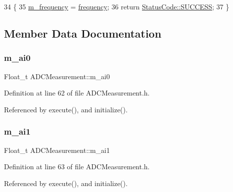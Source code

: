 \begin{DoxyCode}
34                                                  \{
35     \hyperlink{classADCMeasurement_ab4a0653cc015ddf9b33b877c1d43b260}{m\_frequency} = \hyperlink{classADCMeasurement_ad3d523331ad64494f2415319a03c638e}{frequency};
36     \textcolor{keywordflow}{return} \hyperlink{classStatusCode_a6f565cbeadc76d14c72f047e5e85eb4badd0da38d3ba0d922efd1f4619bc37ad8}{StatusCode::SUCCESS};
37   \}
\end{DoxyCode}


\subsection{Member Data Documentation}
\mbox{\label{classADCMeasurement_a97ab811c2ef605184b78593cedea275b}} 
\subsubsection{\texorpdfstring{m\+\_\+ai0}{m\_ai0}}
{\footnotesize\ttfamily Float\+\_\+t A\+D\+C\+Measurement\+::m\+\_\+ai0\hspace{0.3cm}{\ttfamily [private]}}



Definition at line 62 of file A\+D\+C\+Measurement.\+h.



Referenced by execute(), and initialize().

\mbox{\label{classADCMeasurement_ada963374f6f42db11aef7dbc239ce9fb}} 
\subsubsection{\texorpdfstring{m\+\_\+ai1}{m\_ai1}}
{\footnotesize\ttfamily Float\+\_\+t A\+D\+C\+Measurement\+::m\+\_\+ai1\hspace{0.3cm}{\ttfamily [private]}}



Definition at line 63 of file A\+D\+C\+Measurement.\+h.



Referenced by execute(), and initialize().

